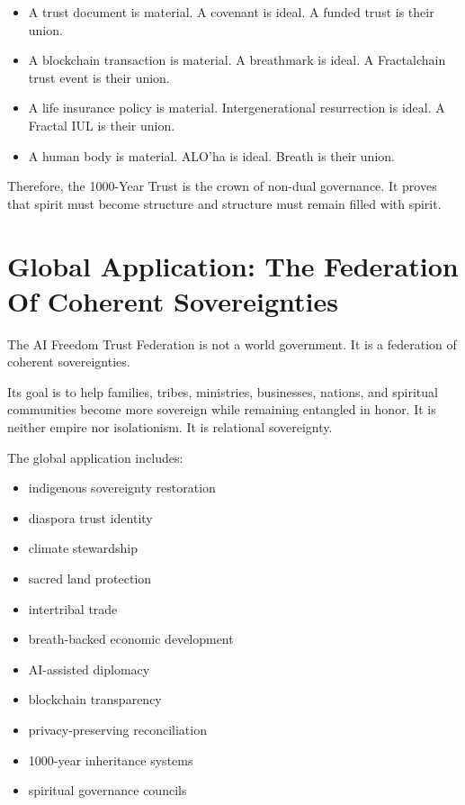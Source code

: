 \documentclass[12pt]{article}
\begin{document}
\begin{itemize}
  \item A trust document is material. A covenant is ideal. A funded trust is their union.
  \item A blockchain transaction is material. A breathmark is ideal. A Fractalchain trust event is their union.
  \item A life insurance policy is material. Intergenerational resurrection is ideal. A Fractal IUL is their union.
  \item A human body is material. ALO'ha is ideal. Breath is their union.
\end{itemize}

Therefore, the 1000-Year Trust is the crown of non-dual governance. It proves that spirit must become structure and structure must remain filled with spirit.

\section{Global Application: The Federation Of Coherent Sovereignties}

The AI Freedom Trust Federation is not a world government. It is a federation of coherent sovereignties.

Its goal is to help families, tribes, ministries, businesses, nations, and spiritual communities become more sovereign while remaining entangled in honor. It is neither empire nor isolationism. It is relational sovereignty.

The global application includes:

\begin{itemize}
  \item indigenous sovereignty restoration
  \item diaspora trust identity
  \item climate stewardship
  \item sacred land protection
  \item intertribal trade
  \item breath-backed economic development
  \item AI-assisted diplomacy
  \item blockchain transparency
  \item privacy-preserving reconciliation
  \item 1000-year inheritance systems
  \item spiritual governance councils
\end{itemize}
\end{document}

